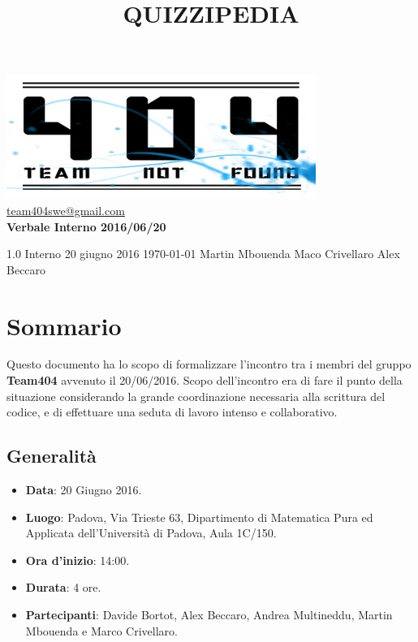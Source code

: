 \documentclass[a4paper,11pt]{article}
\title{\textbf{{\fontsize{10mm}{6mm}\selectfont QUIZZIPEDIA}}}
\begin{document}
	\maketitle
	
	\begin{center}

	\includegraphics{../../../team_not_found.jpg}\\	
	\fontsize{5mm}{3mm}\url{team404swe@gmail.com}\\
	\vspace{40mm}
	\textbf{ Verbale Interno 2016/06/20 }
	\end{center}
	\thispagestyle{empty}	%
			{1.0} 							%
			{Interno} 						%
			{20 giugno 2016} 				%
			{\today} 						%
			{Martin Mbouenda}				%
			{Maco Crivellaro} 			%
			{Alex Beccaro} 				%
	 
	\newpage
	\section{Sommario}
	Questo documento ha lo scopo di formalizzare l'incontro tra i membri del gruppo \textbf{Team404} avvenuto il 20/06/2016. Scopo dell'incontro era di fare il punto della situazione considerando la grande coordinazione necessaria alla scrittura del codice, e di effettuare una seduta di lavoro intenso e collaborativo. 
	\subsection{Generalità}
	\begin{itemize}
	\item\textbf{Data}: 20 Giugno 2016.
	\item\textbf{Luogo}: Padova, Via Trieste 63, Dipartimento di Matematica Pura ed Applicata dell'Università di Padova, Aula 1C/150.
	\item\textbf{Ora d'inizio}: 14:00.
	\item\textbf{Durata}: 4 ore.
	\item\textbf{Partecipanti}: Davide Bortot, Alex Beccaro, Andrea Multineddu, Martin  Mbouenda e Marco Crivellaro.
	\end{itemize}
\end{document}
